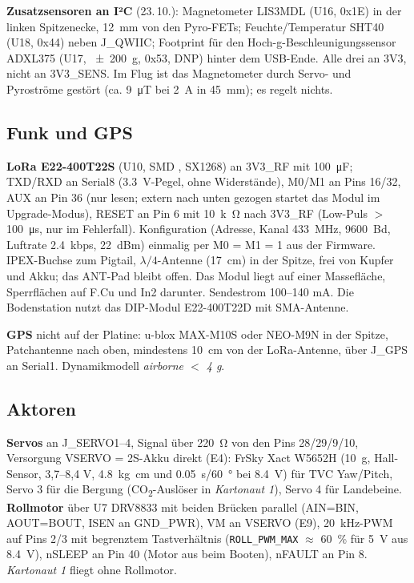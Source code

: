 \documentclass[10pt,a4paper,twoside]{article}
\newcommand{\pin}[1]{\texttt{#1}}
\begin{document}
\textbf{Zusatzsensoren an I²C} (23.\,10.): Magnetometer LIS3MDL (U16, 0x1E) in der linken Spitzenecke, \SI{12}{mm} von den Pyro-FETs; Feuchte/Temperatur SHT40 (U18, 0x44) neben J\_QWIIC; Footprint für den Hoch-g-Beschleunigungssensor ADXL375 (U17, \SI{\pm 200}{g}, 0x53, DNP) hinter dem USB-Ende. Alle drei an 3V3, nicht an 3V3\_SENS. Im Flug ist das Magnetometer durch Servo- und Pyroströme gestört (ca. \SI{9}{\micro T} bei \SI{2}{A} in \SI{45}{mm}); es regelt nichts.

\subsection{Funk und GPS}
\textbf{LoRa E22-400T22S} (U10, SMD , SX1268) an 3V3\_RF mit \SI{100}{\micro F}; TXD/RXD an Serial8 (\SI{3.3}{V}-Pegel, ohne Widerstände), M0/M1 an Pins 16/32, AUX an Pin 36 (nur lesen; extern nach unten gezogen startet das Modul im Upgrade-Modus), RESET an Pin 6 mit \SI{10}{k\ohm} nach 3V3\_RF (Low-Puls $>$ \SI{100}{\micro s}, nur im Fehlerfall). Konfiguration (Adresse, Kanal \SI{433}{MHz}, \SI{9600}{Bd}, Luftrate \SI{2.4}{kbps}, \SI{22}{dBm}) einmalig per M0 = M1 = 1 aus der Firmware. IPEX-Buchse zum Pigtail, $\lambda/4$-Antenne (\SI{17}{cm}) in der Spitze, frei von Kupfer und Akku; das ANT-Pad bleibt offen. Das Modul liegt auf einer Massefläche, Sperrflächen auf F.Cu und In2 darunter. Sendestrom 100--140 mA. Die Bodenstation nutzt das DIP-Modul E22-400T22D mit SMA-Antenne.

\textbf{GPS} nicht auf der Platine: u-blox MAX-M10S oder NEO-M9N in der Spitze, Patchantenne nach oben, mindestens \SI{10}{cm} von der LoRa-Antenne, über J\_GPS an Serial1. Dynamikmodell \emph{airborne $<$ 4 g}.

\subsection{Aktoren}
\textbf{Servos} an J\_SERVO1--4, Signal über \SI{220}{\ohm} von den Pins 28/29/9/10, Versorgung VSERVO = 2S-Akku direkt (E4): FrSky Xact W5652H (\SI{10}{g}, Hall-Sensor, 3,7--8,4 V, \SI{4.8}{kg.cm} und \SI{0.05}{s/60\degree} bei \SI{8.4}{V}) für TVC Yaw/Pitch, Servo 3 für die Bergung (CO\textsubscript{2}-Auslöser in \emph{Kartonaut 1}), Servo 4 für Landebeine. \textbf{Rollmotor} über U7 DRV8833 mit beiden Brücken parallel (AIN=BIN, AOUT=BOUT, ISEN an GND\_PWR), VM an VSERVO (E9), \SI{20}{kHz}-PWM auf Pins 2/3 mit begrenztem Tastverhältnis (\pin{ROLL\_PWM\_MAX} $\approx$ \SI{60}{\percent} für \SI{5}{V} aus \SI{8.4}{V}), nSLEEP an Pin 40 (Motor aus beim Booten), nFAULT an Pin 8. \emph{Kartonaut 1} fliegt ohne Rollmotor.
\end{document}
